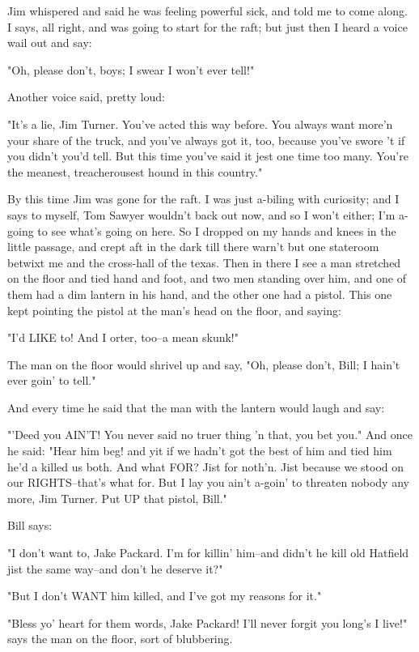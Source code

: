 Jim whispered and said he was feeling powerful sick, and told me to come
along.  I says, all right, and was going to start for the raft; but just
then I heard a voice wail out and say:

"Oh, please don't, boys; I swear I won't ever tell!"

Another voice said, pretty loud:

"It's a lie, Jim Turner.  You've acted this way before.  You always want
more'n your share of the truck, and you've always got it, too, because
you've swore 't if you didn't you'd tell.  But this time you've said it
jest one time too many.  You're the meanest, treacherousest hound in this
country."

By this time Jim was gone for the raft.  I was just a-biling with
curiosity; and I says to myself, Tom Sawyer wouldn't back out now, and so
I won't either; I'm a-going to see what's going on here.  So I dropped on
my hands and knees in the little passage, and crept aft in the dark till
there warn't but one stateroom betwixt me and the cross-hall of the
texas.  Then in there I see a man stretched on the floor and tied hand
and foot, and two men standing over him, and one of them had a dim
lantern in his hand, and the other one had a pistol.  This one kept
pointing the pistol at the man's head on the floor, and saying:

"I'd LIKE to!  And I orter, too--a mean skunk!"

The man on the floor would shrivel up and say, "Oh, please don't, Bill; I
hain't ever goin' to tell."

And every time he said that the man with the lantern would laugh and say:

"'Deed you AIN'T!  You never said no truer thing 'n that, you bet you."
And once he said:  "Hear him beg! and yit if we hadn't got the best of
him and tied him he'd a killed us both.  And what FOR?  Jist for noth'n.
Jist because we stood on our RIGHTS--that's what for.  But I lay you
ain't a-goin' to threaten nobody any more, Jim Turner.  Put UP that
pistol, Bill."

Bill says:

"I don't want to, Jake Packard.  I'm for killin' him--and didn't he kill
old Hatfield jist the same way--and don't he deserve it?"

"But I don't WANT him killed, and I've got my reasons for it."

"Bless yo' heart for them words, Jake Packard!  I'll never forgit you
long's I live!" says the man on the floor, sort of blubbering.

